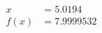 \documentclass[preview]{standalone}
\begin{document}
\begin{align*}
x &= 5.0194\\f(x) &= 7.9999532
\end{align*}
\end{document}
